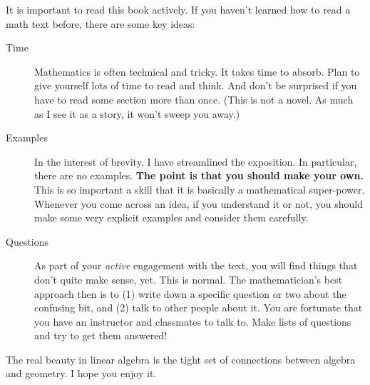 \documentclass[00-livre-main]{subfiles}
\begin{document}
It is important to read this book actively. 
If you haven't learned how to read a math text before, there are some key ideas:
\begin{description}
\item[Time] Mathematics is often technical and tricky. 
It takes time to absorb. 
Plan to give yourself lots of time to read and think. 
And don't be surprised if you have to read some section more than once. 
(This is not a novel. 
As much as I see it as a story, it won't sweep you away.)
\item[Examples] In the interest of brevity, I have streamlined the exposition. 
In particular, there are no examples. 
\textbf{The point is that you should make your own.} 
This is so important a skill that it is basically a mathematical super-power. 
Whenever you come across an idea, if you understand it or not, you should make some very explicit examples and consider them carefully. 
\item[Questions] As part of your \emph{active} engagement with the text, you will find things that don't quite make sense, yet. 
This is normal. 
The mathematician's best approach then is to (1) write down a specific question or two about the confusing bit, and (2) talk to other people about it. 
You are fortunate that you have an instructor and classmates to talk to. 
Make lists of questions and try to get them answered! 
\end{description}

The real beauty in linear algebra is the tight set of connections between algebra and geometry.
I hope you enjoy it.
\end{document}
